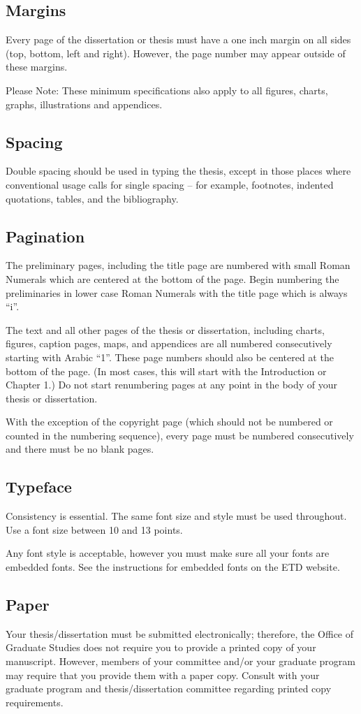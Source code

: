 \subsection{Margins}
%
Every page of the dissertation or thesis must have a one inch margin on all sides (top, bottom, left and right).  However, the page number may appear outside of these margins.

Please Note: These minimum specifications also apply to all figures, charts, graphs, illustrations and appendices.

\subsection{Spacing}
%
Double spacing should be used in typing the thesis, except in those places where conventional usage calls for single spacing -- for example, footnotes, indented quotations, tables, and the bibliography.

\subsection{Pagination}
%
The preliminary pages, including the title page are numbered with small Roman Numerals which are centered at the bottom of the page. Begin numbering the preliminaries in lower case Roman Numerals with the title page which is always ``i''.

The text and all other pages of the thesis or dissertation, including charts, figures, caption pages, maps, and appendices are all numbered consecutively starting with Arabic ``1''. These page numbers should also be centered at the bottom of the page. (In most cases, this will start with the Introduction or Chapter 1.) Do not start renumbering pages at any point in the body of your thesis or dissertation.

With the exception of the copyright page (which should not be numbered or counted in the numbering sequence), every page must be numbered consecutively and there must be no blank pages.

\subsection{Typeface}
%
Consistency is essential. The same font size and style must be used throughout. Use a font size between 10 and 13 points.

Any font style is acceptable, however you must make sure all your fonts are embedded fonts. See the instructions for embedded fonts on the ETD website.

\subsection{Paper}
%
Your thesis/dissertation must be submitted electronically; therefore, the Office of Graduate Studies does not require you to provide a printed copy of your manuscript. However, members of your committee and/or your graduate program may require that you provide them with a paper copy. Consult with your graduate program and thesis/dissertation committee regarding printed copy requirements. 